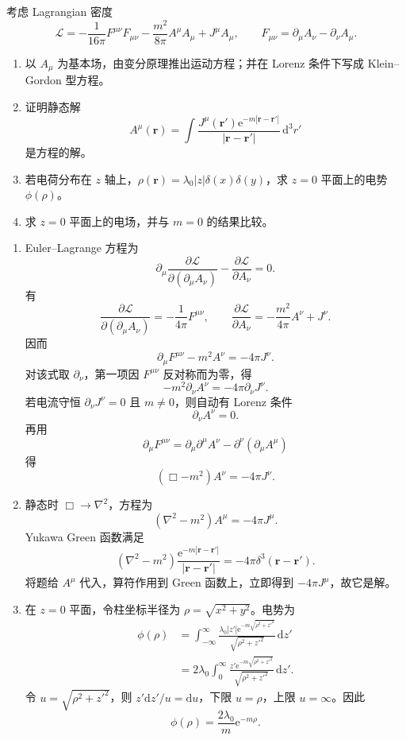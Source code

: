 \begin{question}[Proca 场]
考虑 Lagrangian 密度
\[
  \mathcal L=-\frac{1}{16\pi}F^{\mu\nu}F_{\mu\nu}
  -\frac{m^2}{8\pi}A^\mu A_\mu+J^\mu A_\mu,
  \qquad
  F_{\mu\nu}=\partial_\mu A_\nu-\partial_\nu A_\mu .
\]
\begin{enumerate}
  \item 以 $A_\mu$ 为基本场，由变分原理推出运动方程；并在 Lorenz 条件下写成 Klein--Gordon 型方程。
  \item 证明静态解
  \[
    A^\mu(\mathbf r)=\int\frac{J^\mu(\mathbf r')\mathrm e^{-m|\mathbf r-\mathbf r'|}}{|\mathbf r-\mathbf r'|}\,\mathrm d^3r'
  \]
  是方程的解。
  \item 若电荷分布在 $z$ 轴上，$\rho(\mathbf r)=\lambda_0|z|\delta(x)\delta(y)$，求 $z=0$ 平面上的电势 $\phi(\rho)$。
  \item 求 $z=0$ 平面上的电场，并与 $m=0$ 的结果比较。
\end{enumerate}
\begin{solution}
\begin{enumerate}
  \item Euler--Lagrange 方程为
  \[
    \partial_\mu\frac{\partial\mathcal L}{\partial(\partial_\mu A_\nu)}-
    \frac{\partial\mathcal L}{\partial A_\nu}=0 .
  \]
  有
  \[
    \frac{\partial\mathcal L}{\partial(\partial_\mu A_\nu)}=-\frac{1}{4\pi}F^{\mu\nu},
    \qquad
    \frac{\partial\mathcal L}{\partial A_\nu}=-\frac{m^2}{4\pi}A^\nu+J^\nu .
  \]
  因而
  \[
    \boxed{\partial_\mu F^{\mu\nu}-m^2A^\nu=-4\pi J^\nu} .
  \]
  对该式取 $\partial_\nu$，第一项因 $F^{\mu\nu}$ 反对称而为零，得
  \[
    -m^2\partial_\nu A^\nu=-4\pi\partial_\nu J^\nu .
  \]
  若电流守恒 $\partial_\nu J^\nu=0$ 且 $m\neq0$，则自动有 Lorenz 条件
  \[
    \partial_\nu A^\nu=0 .
  \]
  再用
  \[
    \partial_\mu F^{\mu\nu}=\partial_\mu\partial^\mu A^\nu-
    \partial^\nu(\partial_\mu A^\mu)
  \]
  得
  \[
    \boxed{(\Box-m^2)A^\nu=-4\pi J^\nu} .
  \]

  \item 静态时 $\Box\to\nabla^2$，方程为
  \[
    (\nabla^2-m^2)A^\mu=-4\pi J^\mu .
  \]
  Yukawa Green 函数满足
  \[
    (\nabla^2-m^2)\frac{\mathrm e^{-m|\mathbf r-\mathbf r'|}}{|\mathbf r-\mathbf r'|}
    =-4\pi\delta^3(\mathbf r-\mathbf r') .
  \]
  将题给 $A^\mu$ 代入，算符作用到 Green 函数上，立即得到 $-4\pi J^\mu$，故它是解。

  \item 在 $z=0$ 平面，令柱坐标半径为 $\rho=\sqrt{x^2+y^2}$。电势为
  \[
  \begin{aligned}
    \phi(\rho)&=\int_{-\infty}^{\infty}
    \frac{\lambda_0|z'|\mathrm e^{-m\sqrt{\rho^2+z'^2}}}{\sqrt{\rho^2+z'^2}}\,\mathrm dz' \\
    &=2\lambda_0\int_0^\infty
    \frac{z'\mathrm e^{-m\sqrt{\rho^2+z'^2}}}{\sqrt{\rho^2+z'^2}}\,\mathrm dz' .
  \end{aligned}
  \]
  令 $u=\sqrt{\rho^2+z'^2}$，则 $z'\mathrm dz'/u=\mathrm du$，下限 $u=\rho$，上限 $u=\infty$。因此
  \[
    \boxed{\phi(\rho)=\frac{2\lambda_0}{m}\mathrm e^{-m\rho}} .
  \]


\end{enumerate}
\end{solution}
\end{question}
